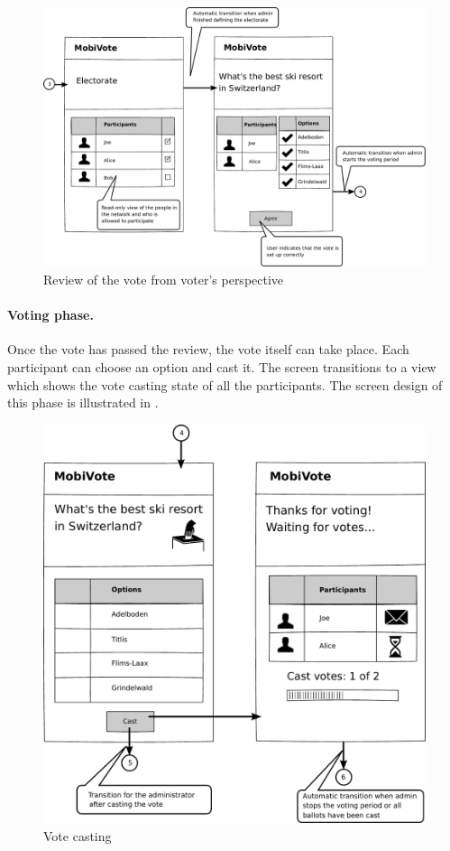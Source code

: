 \documentclass[numbers=noenddot, abstract=on, a4paper, headsepline,
footsepline, oneside, openright, draft=off, listof=leveldown]{scrreprt}
\begin{document}
\begin{figure}[htb]
	\centering
	\includegraphics[height=.3\textheight]{img/storyboard/voter_review}
	\caption{Review of the vote from voter's perspective}
	\label{fig:voter_review}
\end{figure}

\paragraph{Voting phase.}
Once the vote has passed the review, the vote itself can take place. Each
participant can choose an option and cast it. The screen transitions to a view
which shows the vote casting state of all the participants. The screen
design of this phase is illustrated in .

\begin{figure}[htb]
	\centering
	\includegraphics[height=.3\textheight]{img/storyboard/vote}
	\caption{Vote casting}
	\label{fig:vote}
\end{figure}
\end{document}
